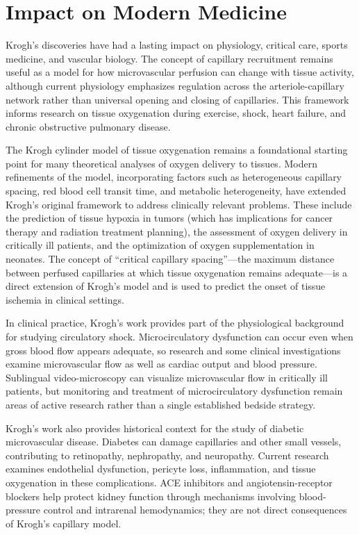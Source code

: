 \section{Impact on Modern Medicine}

Krogh's discoveries have had a lasting impact on physiology, critical care, sports medicine, and vascular biology. The concept of capillary recruitment remains useful as a model for how microvascular perfusion can change with tissue activity, although current physiology emphasizes regulation across the arteriole-capillary network rather than universal opening and closing of capillaries. This framework informs research on tissue oxygenation during exercise, shock, heart failure, and chronic obstructive pulmonary disease.\cite{krogh-microcirculation}

The Krogh cylinder model of tissue oxygenation remains a foundational starting point for many theoretical analyses of oxygen delivery to tissues. Modern refinements of the model, incorporating factors such as heterogeneous capillary spacing, red blood cell transit time, and metabolic heterogeneity, have extended Krogh's original framework to address clinically relevant problems. These include the prediction of tissue hypoxia in tumors (which has implications for cancer therapy and radiation treatment planning), the assessment of oxygen delivery in critically ill patients, and the optimization of oxygen supplementation in neonates. The concept of ``critical capillary spacing''---the maximum distance between perfused capillaries at which tissue oxygenation remains adequate---is a direct extension of Krogh's model and is used to predict the onset of tissue ischemia in clinical settings.

In clinical practice, Krogh's work provides part of the physiological background for studying circulatory shock. Microcirculatory dysfunction can occur even when gross blood flow appears adequate, so research and some clinical investigations examine microvascular flow as well as cardiac output and blood pressure. Sublingual video-microscopy can visualize microvascular flow in critically ill patients, but monitoring and treatment of microcirculatory dysfunction remain areas of active research rather than a single established bedside strategy.

Krogh's work also provides historical context for the study of diabetic microvascular disease. Diabetes can damage capillaries and other small vessels, contributing to retinopathy, nephropathy, and neuropathy. Current research examines endothelial dysfunction, pericyte loss, inflammation, and tissue oxygenation in these complications. ACE inhibitors and angiotensin-receptor blockers help protect kidney function through mechanisms involving blood-pressure control and intrarenal hemodynamics; they are not direct consequences of Krogh's capillary model.

